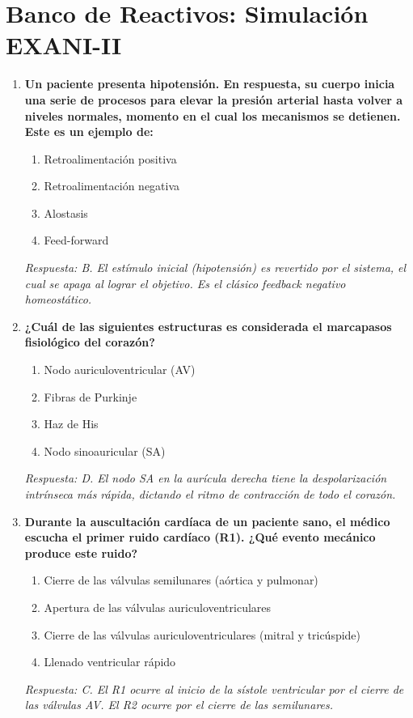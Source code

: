 \documentclass[spanish,letterpaper,oneside]{article}
\begin{document}
\section{Banco de Reactivos: Simulación EXANI-II}
\begin{enumerate}[label=\textbf{\arabic*.}]
    \item \textbf{Un paciente presenta hipotensión. En respuesta, su cuerpo inicia una serie de procesos para elevar la presión arterial hasta volver a niveles normales, momento en el cual los mecanismos se detienen. Este es un ejemplo de:}
    \begin{enumerate}
        \item[A)] Retroalimentación positiva
        \item[B)] Retroalimentación negativa
        \item[C)] Alostasis
        \item[D)] Feed-forward
    \end{enumerate}
    \textit{Respuesta: B. El estímulo inicial (hipotensión) es revertido por el sistema, el cual se apaga al lograr el objetivo. Es el clásico feedback negativo homeostático.}

    \item \textbf{¿Cuál de las siguientes estructuras es considerada el marcapasos fisiológico del corazón?}
    \begin{enumerate}
        \item[A)] Nodo auriculoventricular (AV)
        \item[B)] Fibras de Purkinje
        \item[C)] Haz de His
        \item[D)] Nodo sinoauricular (SA)
    \end{enumerate}
    \textit{Respuesta: D. El nodo SA en la aurícula derecha tiene la despolarización intrínseca más rápida, dictando el ritmo de contracción de todo el corazón.}

    \item \textbf{Durante la auscultación cardíaca de un paciente sano, el médico escucha el primer ruido cardíaco (R1). ¿Qué evento mecánico produce este ruido?}
    \begin{enumerate}
        \item[A)] Cierre de las válvulas semilunares (aórtica y pulmonar)
        \item[B)] Apertura de las válvulas auriculoventriculares
        \item[C)] Cierre de las válvulas auriculoventriculares (mitral y tricúspide)
        \item[D)] Llenado ventricular rápido
    \end{enumerate}
    \textit{Respuesta: C. El R1 ocurre al inicio de la sístole ventricular por el cierre de las válvulas AV. El R2 ocurre por el cierre de las semilunares.}


\end{enumerate}
\end{document}

